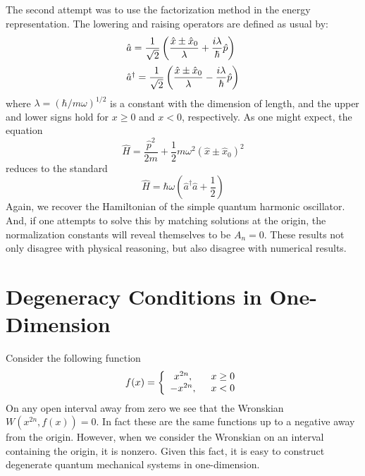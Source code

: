\documentclass[12pt]{article}
\begin{document}
\par The second attempt was to use the factorization method in the energy representation. The lowering and raising operators are defined as usual by:
\begin{eqnarray}
\begin{array}{l}
\hat{a}=\displaystyle\frac{1}{\sqrt{2}}\left(\frac{\hat{x}\pm\hat{x}_0}{\lambda}+\frac{i\lambda}{\hbar}\hat{p}\right)  \vspace{0.2cm}\\
\hat{a}^\dagger=\displaystyle\frac{1}{\sqrt{2}}\left(\frac{\hat{x}\pm\hat{x}_0}{\lambda}-\frac{i\lambda}{\hbar}\hat{p}   \right)
\end{array}
\end{eqnarray}
where $\lambda=\left(\hbar/m\omega\right)^{1/2}$ is a constant with the dimension of length, and the upper and lower signs hold for $x\geq 0$ and $x<0$, respectively.
As one might expect, the equation 
\begin{equation}
\hat{H}=\frac{\hat{p}^2}{2m}+\frac{1}{2}m\omega^2(\hat{x}\pm \hat{x}_0)^2		\label{Hamiltonian}
\end{equation}
reduces to the standard
\begin{equation}
\hat{H}=\hbar\omega\left(\hat{a}^\dagger\hat{a}+\frac{1}{2}\right) 
\end{equation}
Again, we recover the Hamiltonian of the simple quantum harmonic oscillator. And, if one attempts to solve this by matching solutions at the origin, the normalization constants 
will reveal themselves to be $A_n=0$. These results not only disagree with physical reasoning, but also disagree with numerical results.

\section{Degeneracy Conditions in One-Dimension}
Consider the following function 
\begin{equation}
f(x) = \left\{ \begin{array}{cl} x^{2n}, \hspace{0.2cm}& x \geq 0 \\
-x^{2n}, \hspace{0.2cm}& x < 0 \end{array}\right. 
\end{equation}
On any open interval away from zero we see that the Wronskian $W(x^{2n},f(x))=0$. In fact these are the same functions up to a negative away from the origin. However, when we consider the Wronskian on an interval containing the origin, it is nonzero. Given this fact, it is easy to construct degenerate quantum mechanical systems in one-dimension.
\end{document}
